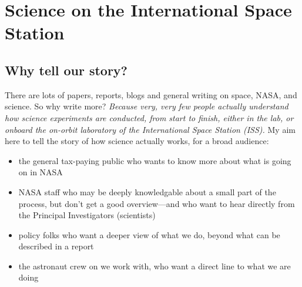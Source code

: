 \section{Science on the International Space Station} \label{science-on-the-international-space-station}

\subsection{Why tell our story?} \label{why-tell-our-story}
There are lots of papers, reports, blogs and general writing on space, NASA, and science. So why write more?
\emph{Because very, very few people actually understand how science experiments are conducted, from start to finish, either in the lab, or onboard the on-orbit laboratory of the International Space Station (ISS).}
My aim here to tell the story of how science actually works, for a broad audience:
\begin{itemize}
\item the general tax-paying public who wants to know more about what is going on in NASA
\item NASA staff who may be deeply knowledgable about a small part of the process, but don't get a good overview---and who want to hear directly from the Principal Investigators (scientists)
\item policy folks who want a deeper view of what we do, beyond what can be described in a report
\item the astronaut crew on  we work with, who want a direct line to what we are doing
\end{itemize}

